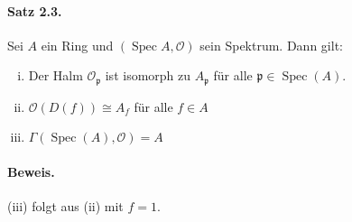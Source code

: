 \documentclass[11pt,b5paper,openany]{memoir}
\begin{document}
\paragraph{Satz 2.3.}\label{2.3} Sei $A$ ein Ring und $(\operatorname{Spec} A,\mathcal{O})$ sein Spektrum. Dann gilt:
\begin{enumerate}[(i)]
\item Der Halm $\mathcal{O}_\mathfrak{p}$ ist isomorph zu $A_\mathfrak{p}$ für alle $\mathfrak{p}\in\operatorname{Spec}(A)$.
\item $\mathcal{O}(D(f))\cong A_f$ für alle $f\in A$
\item $\Gamma(\operatorname{Spec}(A),\mathcal{O})=A$
\end{enumerate}

\paragraph{Beweis.} (iii) folgt aus (ii) mit $f=1$.
\end{document}
